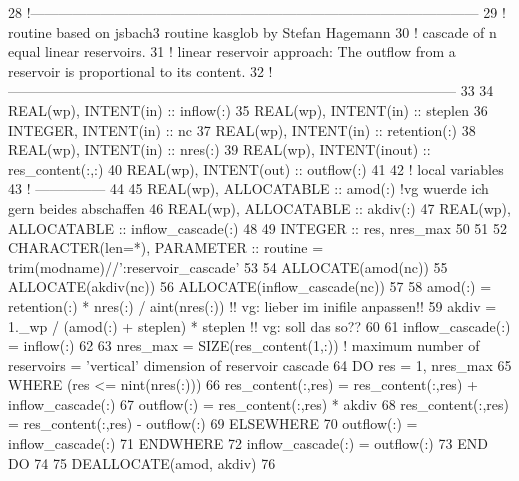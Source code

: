 \begin{DoxyCode}
28   \textcolor{comment}{!------------------------------------------------------------------------------------------------}
29   \textcolor{comment}{! routine based on jsbach3 routine kasglob by Stefan Hagemann}
30   \textcolor{comment}{!   cascade of n equal linear reservoirs. }
31   \textcolor{comment}{!   linear reservoir approach: The outflow from a reservoir is proportional to its content.}
32   \textcolor{comment}{!------------------------------------------------------------------------------------------------}
33 
34     \textcolor{keywordtype}{REAL(wp)},  \textcolor{keywordtype}{INTENT(in)}    :: inflow(:)
35     \textcolor{keywordtype}{REAL(wp)},  \textcolor{keywordtype}{INTENT(in)}    :: steplen
36     \textcolor{keywordtype}{INTEGER},   \textcolor{keywordtype}{INTENT(in)}    :: nc
37     \textcolor{keywordtype}{REAL(wp)},  \textcolor{keywordtype}{INTENT(in)}    :: retention(:)
38     \textcolor{keywordtype}{REAL(wp)},  \textcolor{keywordtype}{INTENT(in)}    :: nres(:)
39     \textcolor{keywordtype}{REAL(wp)},  \textcolor{keywordtype}{INTENT(inout)} :: res\_content(:,:)
40     \textcolor{keywordtype}{REAL(wp)},  \textcolor{keywordtype}{INTENT(out)}   :: outflow(:)
41 
42     \textcolor{comment}{! local variables}
43     \textcolor{comment}{! ---------------}
44 
45     \textcolor{keywordtype}{REAL(wp)}, \textcolor{keywordtype}{ALLOCATABLE}    :: amod(:)       \textcolor{comment}{!vg wuerde ich gern beides abschaffen}
46     \textcolor{keywordtype}{REAL(wp)}, \textcolor{keywordtype}{ALLOCATABLE}    :: akdiv(:)
47     \textcolor{keywordtype}{REAL(wp)}, \textcolor{keywordtype}{ALLOCATABLE}    :: inflow\_cascade(:)
48 
49     \textcolor{keywordtype}{INTEGER} ::  res, nres\_max
50 
51 
52     \textcolor{keywordtype}{CHARACTER(len=*)}, \textcolor{keywordtype}{PARAMETER} :: routine = trim(modname)//\textcolor{stringliteral}{':reservoir\_cascade'}
53 
54     \textcolor{keyword}{ALLOCATE}(amod(nc)) 
55     \textcolor{keyword}{ALLOCATE}(akdiv(nc))
56     \textcolor{keyword}{ALLOCATE}(inflow\_cascade(nc))
57 
58     amod(:) = retention(:) * nres(:) / aint(nres(:))    \textcolor{comment}{!! vg: lieber im inifile anpassen!!}
59     akdiv = 1.\_wp / (amod(:) + steplen) * steplen       \textcolor{comment}{!! vg: soll das so??}
60 
61     inflow\_cascade(:) = inflow(:)
62 
63     nres\_max = \textcolor{keyword}{SIZE}(res\_content(1,:))    \textcolor{comment}{! maximum number of reservoirs = 'vertical' dimension of reservoir
       cascade}
64     \textcolor{keywordflow}{DO} res = 1, nres\_max
65       \textcolor{keywordflow}{WHERE} (res <= nint(nres(:)))
66         res\_content(:,res) = res\_content(:,res) + inflow\_cascade(:)
67         outflow(:) = res\_content(:,res) * akdiv
68         res\_content(:,res) = res\_content(:,res) - outflow(:)
69       \textcolor{keywordflow}{ELSEWHERE}
70         outflow(:) = inflow\_cascade(:)
71 \textcolor{keywordflow}{      ENDWHERE}
72       inflow\_cascade(:) = outflow(:)
73 \textcolor{keywordflow}{    END DO}
74 
75     \textcolor{keyword}{DEALLOCATE}(amod, akdiv)
76 
\end{DoxyCode}


